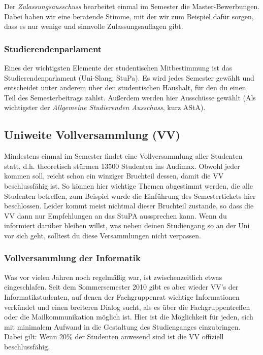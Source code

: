 		Der \emph{Zulassungsausschuss} bearbeitet einmal im Semester die Master-Bewerbungen. Dabei haben wir eine beratende Stimme, mit der wir zum Beispiel dafür sorgen, dass es nur wenige und sinnvolle Zulassungsauflagen gibt.

	\subsubsection*{Studierendenparlament}
		Eines der wichtigsten Elemente der studentischen
		Mitbestimmung ist das Studierendenparlament (Uni-Slang:
		StuPa). Es wird jedes Semester gewählt und entscheidet
		unter anderem über den studentischen Haushalt, für den
		du einen Teil des Semesterbeitrags zahlst. Außerdem werden hier Ausschüsse gewählt (Als wichtigster der \emph{Allgemeine Studierenden Ausschuss}, kurz AStA).
	\subsection*{Uniweite Vollversammlung (VV)}
		Mindestens einmal im Semester findet eine
		Vollversammlung aller Studenten statt, d.h. theoretisch
		stürmen 13500 Studenten ins Audimax. Obwohl jeder kommen
		soll, reicht schon ein winziger Bruchteil dessen, damit
		die VV beschlussfähig ist. So können hier wichtige
		Themen abgestimmt werden, die alle Studenten betreffen,
		zum Beispiel wurde die Einführung des Semestertickets
		hier beschlossen. Leider kommt meist nichtmal dieser
		Bruchteil zustande, so dass die VV dann nur Empfehlungen
		an das StuPA aussprechen kann. Wenn du informiert darüber 
		bleiben willst, was neben deinen Studiengang so an der
		Uni vor sich geht, solltest du diese Versammlungen nicht verpassen.

		\subsubsection*{Vollversammlung der Informatik}
			Was vor vielen Jahren noch regelmäßig war, ist
			zwischenzeitlich etwas eingeschlafen. Seit dem
			Sommersemester 2010 gibt es aber wieder VV's der
			Informatikstudenten, auf denen der
			Fachgruppenrat
			wichtige Informationen verkündet und einen
			breiteren Dialog sucht, als es über die
			Fachgruppentreffen oder die Mailkommunikation
			möglich ist. Hier ist die Möglichkeit für jeden,
			sich mit minimalem Aufwand in die Gestaltung des
			Studienganges einzubringen. Dabei gilt: Wenn
			20\% der Studenten anwesend sind  ist die VV offiziell beschlussfähig.
